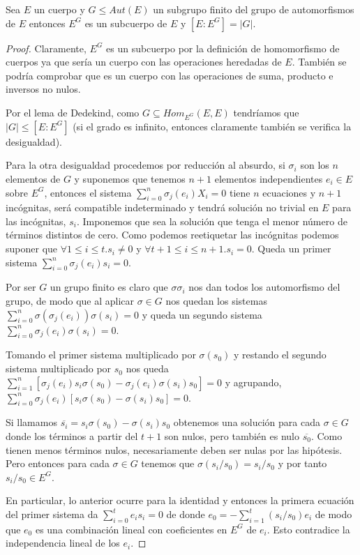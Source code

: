 \begin{theorem}
Sea $E$ un cuerpo y $G \le Aut(E)$ un subgrupo finito del grupo de automorfismos de $E$ entonces $E^G$ es un subcuerpo de $E$ y $[E:E^G] = |G|$. 
\end{theorem}
\begin{proof}
Claramente, $E^G$ es un subcuerpo por la definición de homomorfismo de cuerpos ya que sería un cuerpo con las operaciones heredadas de $E$. También se podría comprobar que es un cuerpo con las operaciones de suma, producto e inversos no nulos. 

Por el lema de Dedekind, como $G \subseteq Hom_{E^G}(E,E)$ tendríamos que $|G| \le [E:E^G]$ (si el grado es infinito, entonces claramente también se verifica la desigualdad). 

Para la otra desigualdad procedemos por reducción al absurdo, si $\sigma_i$ son los $n$ elementos de $G$ y suponemos que tenemos $n+1$ elementos independientes $e_i \in E$ sobre $E^G$, entonces el sistema $\sum_{i = 0}^n \sigma_j(e_i)X_i = 0$ tiene $n$ ecuaciones y $n+1$ incógnitas, será compatible indeterminado y tendrá solución no trivial en $E$ para las incógnitas, $s_i$. Imponemos que sea la solución que tenga el menor número de términos distintos de cero. Como podemos reetiquetar las incógnitas podemos suponer que $\forall 1 \le i \le t. s_i \neq 0$ y $\forall t+1 \le i \le n+1. s_i = 0$. Queda un primer sistema $\sum_{i = 0}^n \sigma_j(e_i)s_i = 0$.

Por ser $G$ un grupo finito es claro que $\sigma \sigma_i$ nos dan todos los automorfismo del grupo, de modo que al aplicar $\sigma \in G$ nos quedan los sistemas $\sum_{i = 0}^n \sigma(\sigma_j(e_i))\sigma(s_i) = 0$ y queda un segundo sistema $\sum_{i = 0}^n \sigma_j(e_i)\sigma(s_i) = 0$.

Tomando el primer sistema multiplicado por $\sigma(s_0)$ y restando el segundo sistema multiplicado por $s_0$ nos queda $\sum_{i = 1}^n [\sigma_j(e_i)s_i\sigma(s_0)-\sigma_j(e_i)\sigma(s_i)s_0] = 0$ y agrupando, $\sum_{i = 0}^n \sigma_j(e_i)[s_i\sigma(s_0) - \sigma(s_i)s_0] = 0$. 

Si llamamos $\overline{s_i} = s_i\sigma(s_0) - \sigma(s_i)s_0$ obtenemos una solución para cada $\sigma \in G$ donde los términos a partir del $t+1$ son nulos, pero también es nulo $\overline{s_0}$. Como tienen menos términos nulos, necesariamente deben ser nulas por las hipótesis. Pero entonces para cada $\sigma \in G$ tenemos que $\sigma(s_i/s_0) = s_i/s_0$ y por tanto $s_i/s_0 \in E^G$. 

En particular, lo anterior ocurre para la identidad y entonces la primera ecuación del primer sistema da $\sum_{i = 0}^t e_is_i = 0$ de donde $e_0 = - \sum_{i = 1}^t (s_i/s_0)e_i$ de modo que $e_0$ es una combinación lineal con coeficientes en $E^G$ de $e_i$. Esto contradice la independencia lineal de los $e_i$. 
\end{proof}

